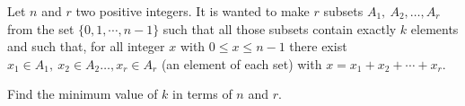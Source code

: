 Let $n$ and $r$ two positive integers. It is wanted to make $r$ subsets $A_1,\ A_2,\dots,A_r$ from the set $\{0,1,\cdots,n-1\}$ such that all those subsets contain exactly $k$ elements and such that, for all integer $x$ with $0\leq{x}\leq{n-1}$ there exist $x_1\in{}A_1,\ x_2\in{}A_2 \dots,x_r\in{}A_r$ (an element of each set) with $x=x_1+x_2+\cdots+x_r$.

Find the minimum value of $k$ in terms of $n$ and $r$.